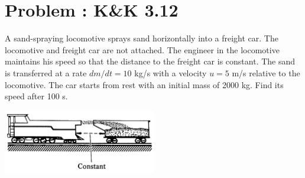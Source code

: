 \documentclass[problems]{esg8012pset}
\begin{document}
\section{Problem \thesection: K\&K 3.12}
  A sand-spraying locomotive sprays sand horizontally into a freight car. The locomotive and freight car are not attached. The engineer in the locomotive maintains his speed so that the distance to the freight car is constant. The sand is transferred at a rate $d m / d t = 10$ kg/s with a velocity $u = 5$ m/s relative to the locomotive. The car starts from rest with an initial mass of 2000 kg. Find its speed after 100 s.
  \begin{center}\includegraphics[width=0.5\textwidth]{ps_04_3}\end{center}
\end{document}
